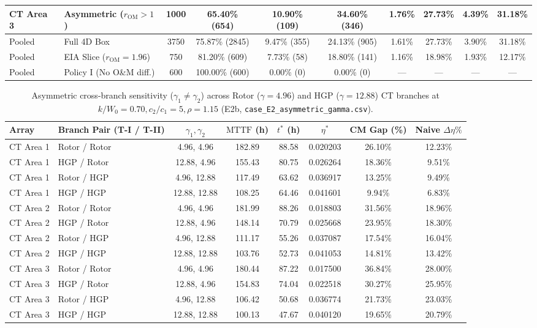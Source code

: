 \documentclass[10pt,a4paper]{article}
\begin{document}
\begin{table}[htbp]
\begin{tabular*}{\textwidth}{@{\extracolsep{\fill}}llcccc|cc|cc@{}}
CT Area 3 & Asymmetric ($r_{\mathrm{OM}}>1$)    & 1000 & 65.40\% (654) & 10.90\% (109) & 34.60\% (346) & 1.76\% & 27.73\% & 4.39\% & 31.18\% \\
\midrule
Pooled & Full 4D Box           & 3750 & 75.87\% (2845) & 9.47\% (355) & 24.13\% (905) & 1.61\% & 27.73\% & 3.90\% & 31.18\% \\
Pooled & EIA Slice ($r_{\mathrm{OM}}=1.96$) & 750  & 81.20\% (609) & 7.73\% (58) & 18.80\% (141) & 1.16\% & 18.98\% & 1.93\% & 12.17\% \\
Pooled & Policy I (No O\&M diff.) & 600 & 100.00\% (600) & 0.00\% (0) & 0.00\% (0) & --- & --- & --- & --- \\
\bottomrule
\end{tabular*}
\end{table}

\begin{table}[htbp]
\centering
\scriptsize
\caption{Asymmetric cross-branch sensitivity ($\gamma_1 \neq \gamma_2$) across Rotor ($\gamma=4.96$) and HGP ($\gamma=12.88$) CT branches at $k/W_0 = 0.70, c_2/c_1 = 5, \rho = 1.15$ (E2b, \texttt{case\_E2\_asymmetric\_gamma.csv}).}
\label{tab:S8}
\begin{tabular*}{\textwidth}{@{\extracolsep{\fill}}llcccccc@{}}
\toprule
Array & Branch Pair (T-I / T-II) & $\gamma_1, \gamma_2$ & $\mathrm{MTTF}$ (h) & $t^*$ (h) & $\eta^*$ & CM Gap (\%) & Naive $\Delta\eta\%$ \\
\midrule
CT Area 1 & Rotor / Rotor & 4.96, 4.96   & 182.89 & 88.58 & 0.020203 & 26.10\% & 12.23\% \\
CT Area 1 & HGP / Rotor   & 12.88, 4.96  & 155.43 & 80.75 & 0.026264 & 18.36\% & 9.51\%  \\
CT Area 1 & Rotor / HGP   & 4.96, 12.88  & 117.49 & 63.62 & 0.036917 & 13.25\% & 9.49\%  \\
CT Area 1 & HGP / HGP     & 12.88, 12.88 & 108.25 & 64.46 & 0.041601 & 9.94\%  & 6.83\%  \\
\midrule
CT Area 2 & Rotor / Rotor & 4.96, 4.96   & 181.99 & 88.26 & 0.018803 & 31.56\% & 18.96\% \\
CT Area 2 & HGP / Rotor   & 12.88, 4.96  & 148.14 & 70.79 & 0.025668 & 23.95\% & 18.30\% \\
CT Area 2 & Rotor / HGP   & 4.96, 12.88  & 111.17 & 55.26 & 0.037087 & 17.54\% & 16.04\% \\
CT Area 2 & HGP / HGP     & 12.88, 12.88 & 103.76 & 52.73 & 0.041053 & 14.81\% & 13.42\% \\
\midrule
CT Area 3 & Rotor / Rotor & 4.96, 4.96   & 180.44 & 87.22 & 0.017500 & 36.84\% & 28.00\% \\
CT Area 3 & HGP / Rotor   & 12.88, 4.96  & 154.83 & 74.04 & 0.022518 & 30.27\% & 25.95\% \\
CT Area 3 & Rotor / HGP   & 4.96, 12.88  & 106.42 & 50.68 & 0.036774 & 21.73\% & 23.03\% \\
CT Area 3 & HGP / HGP     & 12.88, 12.88 & 100.13 & 47.67 & 0.040120 & 19.65\% & 20.79\% \\
\bottomrule
\end{tabular*}
\end{table}
\end{document}
